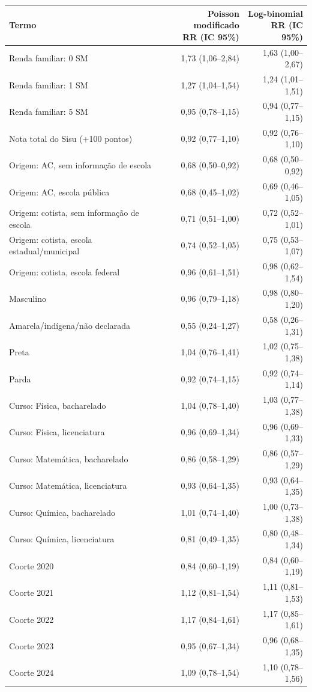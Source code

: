 \begin{tabular}{lrr}
\toprule
Termo & \makecell[r]{Poisson modificado\\RR (IC 95\%)} & \makecell[r]{Log-binomial\\RR (IC 95\%)} \\
\midrule
Renda familiar: 0 SM & 1,73 (1,06--2,84) & 1,63 (1,00--2,67) \\
Renda familiar: 1 SM & 1,27 (1,04--1,54) & 1,24 (1,01--1,51) \\
Renda familiar: 5 SM & 0,95 (0,78--1,15) & 0,94 (0,77--1,15) \\
Nota total do Sisu (+100 pontos) & 0,92 (0,77--1,10) & 0,92 (0,76--1,10) \\
Origem: AC, sem informação de escola & 0,68 (0,50--0,92) & 0,68 (0,50--0,92) \\
Origem: AC, escola pública & 0,68 (0,45--1,02) & 0,69 (0,46--1,05) \\
Origem: cotista, sem informação de escola & 0,71 (0,51--1,00) & 0,72 (0,52--1,01) \\
Origem: cotista, escola estadual/municipal & 0,74 (0,52--1,05) & 0,75 (0,53--1,07) \\
Origem: cotista, escola federal & 0,96 (0,61--1,51) & 0,98 (0,62--1,54) \\
Masculino & 0,96 (0,79--1,18) & 0,98 (0,80--1,20) \\
Amarela/indígena/não declarada & 0,55 (0,24--1,27) & 0,58 (0,26--1,31) \\
Preta & 1,04 (0,76--1,41) & 1,02 (0,75--1,38) \\
Parda & 0,92 (0,74--1,15) & 0,92 (0,74--1,14) \\
Curso: Física, bacharelado & 1,04 (0,78--1,40) & 1,03 (0,77--1,38) \\
Curso: Física, licenciatura & 0,96 (0,69--1,34) & 0,96 (0,69--1,33) \\
Curso: Matemática, bacharelado & 0,86 (0,58--1,29) & 0,86 (0,57--1,29) \\
Curso: Matemática, licenciatura & 0,93 (0,64--1,35) & 0,93 (0,64--1,35) \\
Curso: Química, bacharelado & 1,01 (0,74--1,40) & 1,00 (0,73--1,38) \\
Curso: Química, licenciatura & 0,81 (0,49--1,35) & 0,80 (0,48--1,34) \\
Coorte 2020 & 0,84 (0,60--1,19) & 0,84 (0,60--1,19) \\
Coorte 2021 & 1,12 (0,81--1,54) & 1,11 (0,81--1,53) \\
Coorte 2022 & 1,17 (0,84--1,61) & 1,17 (0,85--1,61) \\
Coorte 2023 & 0,95 (0,67--1,34) & 0,96 (0,68--1,35) \\
Coorte 2024 & 1,09 (0,78--1,54) & 1,10 (0,78--1,56) \\
\bottomrule
\end{tabular}

